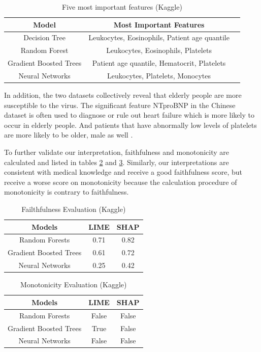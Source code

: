\begin{table}[H]
\centering
\begin{tabular}{@{}ccc@{}}
\toprule
Model                   & Most Important Features \\ \midrule
Decision Tree           & Leukocytes, Eosinophils, Patient age quantile      \\
Random Forest           & Leukocytes, Eosinophils, Platelets        \\
Gradient Boosted Trees  & Patient age quantile, Hematocrit, Platelets  \\
Neural Networks         & Leukocytes, Platelets, Monocytes          \\  \bottomrule
\end{tabular}
\caption{Five most important features (Kaggle)}
\label{tab:important_feature_kaggle}
\end{table}

In addition, the two datasets collectively reveal that elderly people are more susceptible to the virus. The significant feature NTproBNP in the Chinese dataset is often used to diagnose or rule out heart failure which is more likely to occur in elderly people. And patients that have abnormally low levels of platelets are more likely to be older, male as well \citep{wool2021impact}.
\color{black}

To further validate our interpretation, faithfulness and monotonicity are calculated and listed in tables \ref{kaggle_faith} and \ref{kaggle_mono}. Similarly, our interpretations are consistent with medical knowledge and receive a good faithfulness score, but receive a worse score on monotonicity because the calculation procedure of monotonicity is contrary to faithfulness.

\begin{table}[H]
\centering
\begin{tabular}{@{}ccc@{}}
\toprule
Models   & LIME & SHAP \\ \midrule
Random Forests & 0.71  & 0.82      \\
Gradient Boosted Trees & 0.61 & 0.72 \\
Neural Networks & 0.25 & 0.42 \\ \bottomrule
\end{tabular}
\caption{Failthfulness Evaluation (Kaggle)}
\label{kaggle_faith}
\end{table}

\begin{table}[H]
\centering
\begin{tabular}{@{}ccc@{}}
\toprule
Models   & LIME & SHAP \\ \midrule
Random Forests & False  & False      \\
Gradient Boosted Trees & True & False \\
Neural Networks & False & False \\ \bottomrule
\end{tabular}
\caption{Monotonicity Evaluation (Kaggle)}
\label{kaggle_mono}
\end{table}

